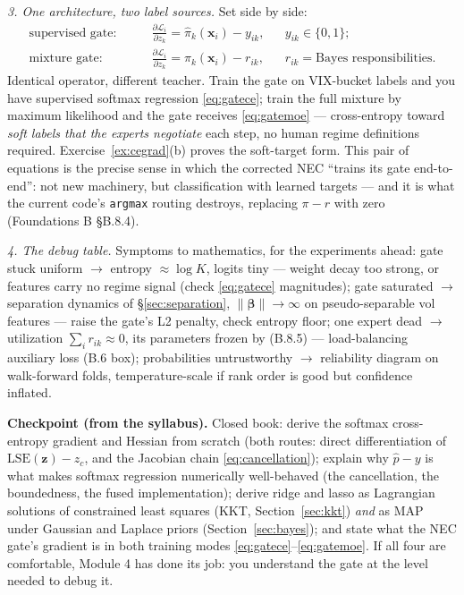 \documentclass[11pt]{article}
\numberwithin{equation}{section}
\theoremstyle{plain}
\theoremstyle{definition}
\theoremstyle{remark}
\newcommand{\x}{\bm{x}}
\newcommand{\bbeta}{\bm{\beta}}
\begin{document}
\emph{3. One architecture, two label sources.} Set side by side:
\begin{align}
\text{supervised gate:}\qquad
&\frac{\partial \mathcal{L}_i}{\partial z_k} = \hat\pi_k(\x_i) - y_{ik},
&&y_{ik} \in \{0,1\};
\label{eq:gatece}\\
\text{mixture gate:}\qquad
&\frac{\partial \mathcal{L}_i}{\partial z_k} = \pi_k(\x_i) - r_{ik},
&&r_{ik} = \text{Bayes responsibilities.}
\label{eq:gatemoe}
\end{align}
Identical operator, different teacher. Train the gate on VIX-bucket labels and you have supervised softmax regression \eqref{eq:gatece}; train the full mixture by maximum likelihood and the gate receives \eqref{eq:gatemoe} --- cross-entropy toward \emph{soft labels that the experts negotiate} each step, no human regime definitions required. Exercise~\ref{ex:cegrad}(b) proves the soft-target form. This pair of equations is the precise sense in which the corrected NEC ``trains its gate end-to-end'': not new machinery, but classification with learned targets --- and it is what the current code's \texttt{argmax} routing destroys, replacing $\pi - r$ with zero (Foundations B \S B.8.4).

\emph{4. The debug table.} Symptoms to mathematics, for the experiments ahead: gate stuck uniform $\to$ entropy $\approx \log K$, logits tiny --- weight decay too strong, or features carry no regime signal (check \eqref{eq:gatece} magnitudes); gate saturated $\to$ separation dynamics of \S\ref{sec:separation}, $\|\bbeta\| \to \infty$ on pseudo-separable vol features --- raise the gate's L2 penalty, check entropy floor; one expert dead $\to$ utilization $\sum_i r_{ik} \approx 0$, its parameters frozen by (B.8.5) --- load-balancing auxiliary loss (B.6 box); probabilities untrustworthy $\to$ reliability diagram on walk-forward folds, temperature-scale if rank order is good but confidence inflated.

\medskip
\noindent\textbf{Checkpoint (from the syllabus).} Closed book: derive the softmax cross-entropy gradient and Hessian from scratch (both routes: direct differentiation of $\mathrm{LSE}(\bm z) - z_c$, and the Jacobian chain \eqref{eq:cancellation}); explain why $\hat p - y$ is what makes softmax regression numerically well-behaved (the cancellation, the boundedness, the fused implementation); derive ridge and lasso as Lagrangian solutions of constrained least squares (KKT, Section~\ref{sec:kkt}) \emph{and} as MAP under Gaussian and Laplace priors (Section~\ref{sec:bayes}); and state what the NEC gate's gradient is in both training modes \eqref{eq:gatece}--\eqref{eq:gatemoe}. If all four are comfortable, Module 4 has done its job: you understand the gate at the level needed to debug it.
\end{document}
